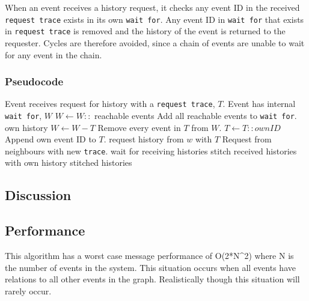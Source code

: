 \newpar When an event receives a history request, it checks any event ID in the received \texttt{request trace} exists in its own \texttt{wait for}. Any event ID in \texttt{wait for} that exists in \texttt{request trace} is removed and the history of the event is returned to the requester. 
Cycles are therefore avoided, since a chain of events are unable to wait for any event in the chain.


\subsubsection*{Pseudocode}
\begin{algorithmic}
	\State Event receives request for history with a \texttt{request trace}, $T$.
	\State Event has internal \texttt{wait for}, $W$
	\State
	\State $W\gets W::$ reachable events \Comment Add all reachable events to \texttt{wait for}.
	\Return own history
	\Else
	\State $W\gets W-T$ \Comment Remove every event in $T$ from $W$.
	\State $T\gets T::ownID$ \Comment Append own event ID to $T$.
	\State
	\State request history from $w$ with $T$ \Comment Request from neighbours with new \texttt{trace}.
	\EndFor
	\State wait for receiving histories
	\State stitch received histories with own history
	\State
	\Return stitched histories
	\EndIf
\end{algorithmic}


\subsection{Discussion} %

\subsection{Performance} %
This algorithm has a worst case message performance of O(2*N^2) where N is the number of events in the system. This situation occurs when all events have relations to all other events in the graph. Realistically though this situation will rarely occur.